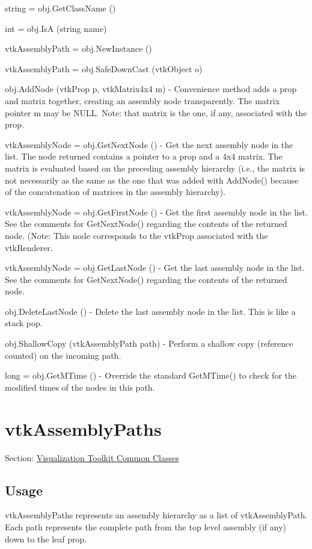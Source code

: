 \begin{DoxyItemize}
\item {\ttfamily string = obj.\-Get\-Class\-Name ()}  
\item {\ttfamily int = obj.\-Is\-A (string name)}  
\item {\ttfamily vtk\-Assembly\-Path = obj.\-New\-Instance ()}  
\item {\ttfamily vtk\-Assembly\-Path = obj.\-Safe\-Down\-Cast (vtk\-Object o)}  
\item {\ttfamily obj.\-Add\-Node (vtk\-Prop p, vtk\-Matrix4x4 m)} -\/ Convenience method adds a prop and matrix together, creating an assembly node transparently. The matrix pointer m may be N\-U\-L\-L. Note\-: that matrix is the one, if any, associated with the prop.  
\item {\ttfamily vtk\-Assembly\-Node = obj.\-Get\-Next\-Node ()} -\/ Get the next assembly node in the list. The node returned contains a pointer to a prop and a 4x4 matrix. The matrix is evaluated based on the preceding assembly hierarchy (i.\-e., the matrix is not necessarily as the same as the one that was added with Add\-Node() because of the concatenation of matrices in the assembly hierarchy).  
\item {\ttfamily vtk\-Assembly\-Node = obj.\-Get\-First\-Node ()} -\/ Get the first assembly node in the list. See the comments for Get\-Next\-Node() regarding the contents of the returned node. (Note\-: This node corresponds to the vtk\-Prop associated with the vtk\-Renderer.  
\item {\ttfamily vtk\-Assembly\-Node = obj.\-Get\-Last\-Node ()} -\/ Get the last assembly node in the list. See the comments for Get\-Next\-Node() regarding the contents of the returned node.  
\item {\ttfamily obj.\-Delete\-Last\-Node ()} -\/ Delete the last assembly node in the list. This is like a stack pop.  
\item {\ttfamily obj.\-Shallow\-Copy (vtk\-Assembly\-Path path)} -\/ Perform a shallow copy (reference counted) on the incoming path.  
\item {\ttfamily long = obj.\-Get\-M\-Time ()} -\/ Override the standard Get\-M\-Time() to check for the modified times of the nodes in this path.  
\end{DoxyItemize}\hypertarget{vtkcommon_vtkassemblypaths}{}\section{vtk\-Assembly\-Paths}\label{vtkcommon_vtkassemblypaths}
Section\-: \hyperlink{sec_vtkcommon}{Visualization Toolkit Common Classes} \hypertarget{vtkwidgets_vtkxyplotwidget_Usage}{}\subsection{Usage}\label{vtkwidgets_vtkxyplotwidget_Usage}
vtk\-Assembly\-Paths represents an assembly hierarchy as a list of vtk\-Assembly\-Path. Each path represents the complete path from the top level assembly (if any) down to the leaf prop.

